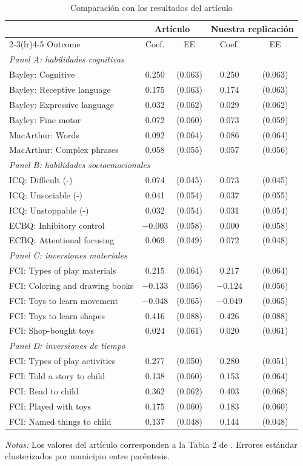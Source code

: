 \documentclass[11pt,a4paper]{article}
\newcommand{\notas}[1]{\par\vspace{0.3em}\begin{minipage}{0.92\linewidth}\footnotesize\textit{Notas:} #1\end{minipage}}
\begin{document}
\begin{table}[H]\centering
\caption{Comparación con los resultados del artículo}\label{tab:paper}
\small
\begin{tabular}{lcccc}
\toprule
 & \multicolumn{2}{c}{Artículo} & \multicolumn{2}{c}{Nuestra replicación} \\
\cmidrule(lr){2-3}\cmidrule(lr){4-5}
Outcome & Coef. & EE & Coef. & EE \\
\midrule
\multicolumn{5}{l}{\textit{Panel A: habilidades cognitivas}}\\
Bayley: Cognitive & 0.250 & (0.063) & 0.250 & (0.063) \\
Bayley: Receptive language & 0.175 & (0.063) & 0.174 & (0.063) \\
Bayley: Expressive language & 0.032 & (0.062) & 0.029 & (0.062) \\
Bayley: Fine motor & 0.072 & (0.060) & 0.073 & (0.059) \\
MacArthur: Words & 0.092 & (0.064) & 0.086 & (0.064) \\
MacArthur: Complex phrases & 0.058 & (0.055) & 0.057 & (0.056) \\
\multicolumn{5}{l}{\textit{Panel B: habilidades socioemocionales}}\\
ICQ: Difficult (-) & 0.074 & (0.045) & 0.073 & (0.045) \\
ICQ: Unsociable (-) & 0.041 & (0.054) & 0.037 & (0.055) \\
ICQ: Unstoppable (-) & 0.032 & (0.054) & 0.031 & (0.054) \\
ECBQ: Inhibitory control & $-0.003$ & (0.058) & 0.000 & (0.058) \\
ECBQ: Attentional focusing & 0.069 & (0.049) & 0.072 & (0.048) \\
\multicolumn{5}{l}{\textit{Panel C: inversiones materiales}}\\
FCI: Types of play materials & 0.215 & (0.064) & 0.217 & (0.064) \\
FCI: Coloring and drawing books & $-0.133$ & (0.056) & $-0.124$ & (0.056) \\
FCI: Toys to learn movement & $-0.048$ & (0.065) & $-0.049$ & (0.065) \\
FCI: Toys to learn shapes & 0.416 & (0.088) & 0.426 & (0.088) \\
FCI: Shop-bought toys & 0.024 & (0.061) & 0.020 & (0.061) \\
\multicolumn{5}{l}{\textit{Panel D: inversiones de tiempo}}\\
FCI: Types of play activities & 0.277 & (0.050) & 0.280 & (0.051) \\
FCI: Told a story to child & 0.138 & (0.060) & 0.153 & (0.064) \\
FCI: Read to child & 0.362 & (0.062) & 0.403 & (0.068) \\
FCI: Played with toys & 0.175 & (0.060) & 0.183 & (0.060) \\
FCI: Named things to child & 0.137 & (0.048) & 0.144 & (0.048) \\
\bottomrule
\end{tabular}
\notas{Los valores del artículo corresponden a la Tabla 2 de \citet{attanasio}. Errores estándar clusterizados por municipio entre paréntesis.}
\end{table}
\end{document}
